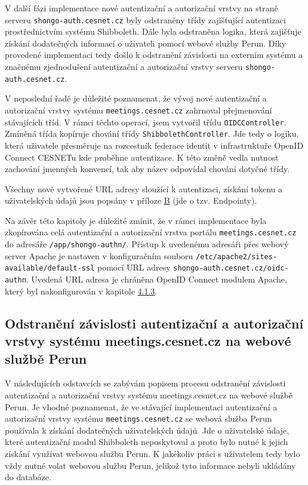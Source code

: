 \documentclass[
  printed, %
  twoside, %
  table,   %
  nolof,     %
  nolot,     %
]{fithesis3}
\begin{document}
\par

V další fázi implementace nové autentizační a autorizační vrstvy na straně serveru \texttt{shongo-auth.cesnet.cz} byly odstraněny třídy zajišťující autentizaci prostřednictvím systému Shibboleth. Dále byla odstraněna logika, která zajišťuje získání dodatečných informací o uživateli pomocí webové služby Perun. Díky provedené implementaci tedy došlo k odstranění závislosti na externím systému a značnému zjednodušení autentizační a autorizační vrstvy serveru \texttt{shongo-auth.cesnet.cz}.

\par

V neposlední řadě je důležité poznamenat, že vývoj nové autentizační a autorizační vrstvy systému \texttt{meetings.cesnet.cz} zahrnoval přejmenování stávajících tříd. V rámci těchto operací, jsem vytvořil třídu \texttt{OIDCController}. Zmíněná třída kopíruje chování třídy \texttt{ShibbolethController}. Jde tedy o logiku, která uživatele přesměruje na rozcestník federace identit v infrastruktuře OpenID Connect CESNETu kde proběhne autentizace. K této změně vedla nutnost zachování jmenných konvencí, tak aby název odpovídal chování dotyčné třídy. 
\par
Všechny nově vytvořené URL adresy sloužící k autentizaci, získání tokenu a uživatelských údajů jsou popsány v příloze \hyperref[oidcEndpoints]{B} (jde o tzv. Endpointy).
\par 

Na závěr této kapitoly je důležité zmínit, že v rámci implementace byla zkopírována celá autentizační a autorizační vrstva portálu \texttt{meetings.cesnet.cz} do adresáře \texttt{/app/shongo-authn/}. Přístup k uvedenému adresáři přes webový server Apache je nastaven v konfiguračním souboru \texttt{/etc/apache2/sites-available/default-ssl} pomocí URL adresy \texttt{shongo-auth.cesnet.cz/oidc-authn}. Uvedená URL adresa je chráněna OpenID Connect modulem Apache, který byl nakonfigurován v kapitole \hyperref[sec:mod-conf]{4.1.3}.

\subsection{Odstranění závislosti autentizační a autorizační vrstvy systému meetings.cesnet.cz na webové službě Perun}
\label{zpracovaniAUlozeniPerun}
V následujících odstavcích se zabývám popisem procesu odstranění závislosti autentizační a autorizační vrstvy systému meetings.cesnet.cz na webové službě Perun. Je vhodné poznamenat, že ve stávající implementaci autentizační a autorizační vrstvy systému \texttt{meetings.cesnet.cz} se webová služba Perun používala k získání dodatečných uživatelských údajů. Jde o uživatelské údaje, které autentizační modul Shibboleth neposkytoval a proto bylo nutné k jejich získání využívat webovou službu Perun. K jakékoliv práci s uživatelem tedy bylo vždy nutné volat webovou službu Perun, jelikož tyto informace nebyli ukládány do databáze. 
\end{document}
